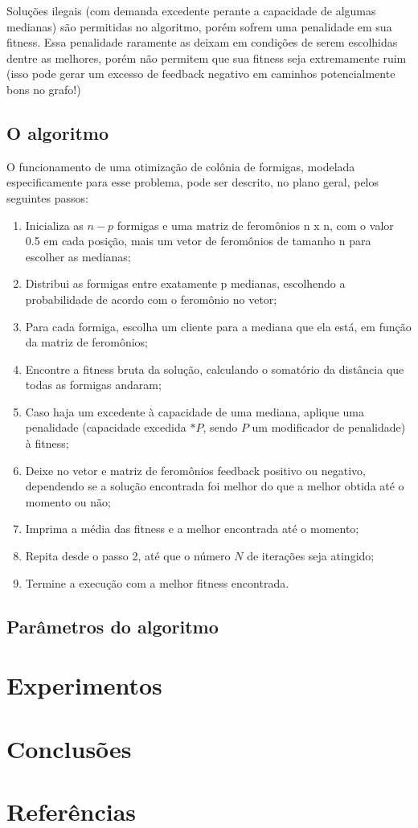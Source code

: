 \documentclass[11pt]{article}
\begin{document}
Soluções ilegais (com demanda excedente perante a capacidade de algumas medianas) são permitidas no algoritmo, porém sofrem uma penalidade em sua fitness. Essa penalidade raramente as deixam em condições de serem escolhidas dentre as melhores, porém não permitem que sua fitness seja extremamente ruim (isso pode gerar um excesso de feedback negativo em caminhos potencialmente bons no grafo!)

\subsection{O algoritmo}

O funcionamento de uma otimização de colônia de formigas, modelada especificamente para esse problema, pode ser descrito, no plano geral, pelos seguintes passos:

\begin{enumerate}
	\item Inicializa as $n - p$ formigas e uma matriz de feromônios n x n, com o valor 0.5 em cada posição, mais um vetor de feromônios de tamanho n para escolher as medianas;
	\item Distribui as formigas entre exatamente p medianas, escolhendo a probabilidade de acordo com o feromônio no vetor;
	\item Para cada formiga, escolha um cliente para a mediana que ela está, em função da matriz de feromônios;
	\item Encontre a fitness bruta da solução, calculando o somatório da distância que todas as formigas andaram;
	\item Caso haja um excedente à capacidade de uma mediana, aplique uma penalidade (capacidade excedida $* P$, sendo $P$ um modificador de penalidade) à fitness;
	\item Deixe no vetor e matriz de feromônios feedback positivo ou negativo, dependendo se a solução encontrada foi melhor do que a melhor obtida até o momento ou não;
	\item Imprima a média das fitness e a melhor encontrada até o momento;
	\item Repita desde o passo 2, até que o número $N$ de iterações seja atingido;
	\item Termine a execução com a melhor fitness encontrada.
\end{enumerate}

\subsection{Parâmetros do algoritmo}

\section{Experimentos}

\section{Conclusões}

\section{Referências}
\end{document}
